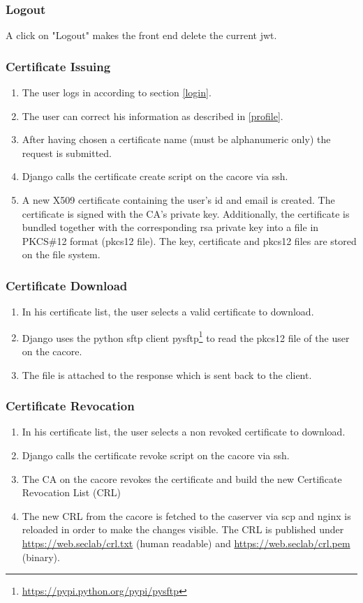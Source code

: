 \documentclass[english]{article}
\begin{document}
 \subsubsection{Logout}
 A click on "Logout" makes the front end delete the current jwt.
 
 \subsubsection{Certificate Issuing}
 \begin{enumerate}
 \item The user logs in according to section \ref{login}.
 \item The user can correct his information as described in \ref{profile}.
 \item After having chosen a certificate name (must be alphanumeric only) the request is submitted.
 \item Django calls the certificate create script on the cacore via ssh.
 \item A new X509 certificate containing the user's id and email is created. The certificate is signed with the CA's private key. Additionally, the certificate is bundled together with the corresponding rsa private key into a file in PKCS\#12 format (pkcs12 file). The key, certificate and pkcs12 files are stored on the file system.
 \end{enumerate}
 
 \subsubsection{Certificate Download}
\begin{enumerate}
\item In his certificate list, the user selects a valid certificate to download. 
\item Django uses the python sftp client pysftp\footnote{\label{pysftp}\url{https://pypi.python.org/pypi/pysftp}} to read the pkcs12 file of the user on the cacore. 
\item The file is attached to the response which is sent back to the client.
\end{enumerate} 
 
 \subsubsection{Certificate Revocation}
 \begin{enumerate}
 \item In his certificate list, the user selects a non revoked certificate to download. 
 \item Django calls the certificate revoke script on the cacore via ssh.
 \item The CA on the cacore revokes the certificate and build the new Certificate Revocation List (CRL)
 \item The new CRL from the cacore is fetched to the caserver via scp and nginx is reloaded in order to make the changes visible. The CRL is published under \url{https://web.seclab/crl.txt} (human readable) and \url{https://web.seclab/crl.pem} (binary).
 \end{enumerate}
 
\end{document}

